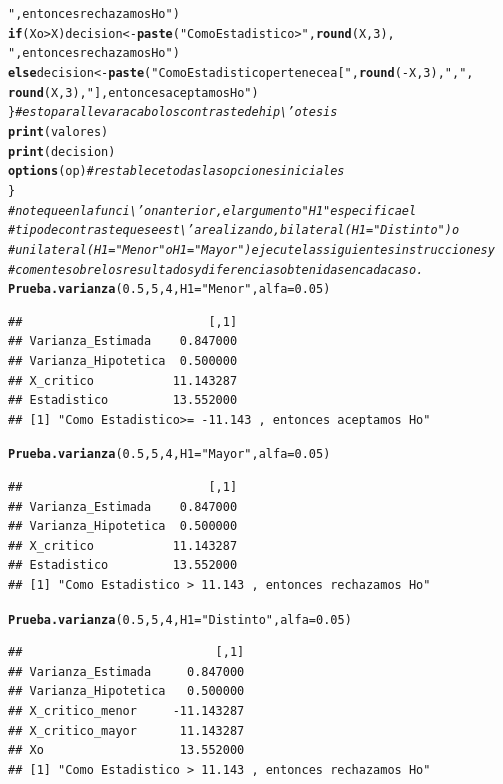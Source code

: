 \documentclass[12pt,letterpaper]{article}\usepackage[]{graphicx}\usepackage[]{color}
\makeatletter
\newcommand{\hlnum}[1]{\textcolor[rgb]{0.686,0.059,0.569}{#1}}%
\newcommand{\hlstr}[1]{\textcolor[rgb]{0.192,0.494,0.8}{#1}}%
\newcommand{\hlcom}[1]{\textcolor[rgb]{0.678,0.584,0.686}{\textit{#1}}}%
\newcommand{\hlopt}[1]{\textcolor[rgb]{0,0,0}{#1}}%
\newcommand{\hlstd}[1]{\textcolor[rgb]{0.345,0.345,0.345}{#1}}%
\newcommand{\hlkwa}[1]{\textcolor[rgb]{0.161,0.373,0.58}{\textbf{#1}}}%
\newcommand{\hlkwb}[1]{\textcolor[rgb]{0.69,0.353,0.396}{#1}}%
\newcommand{\hlkwc}[1]{\textcolor[rgb]{0.333,0.667,0.333}{#1}}%
\newcommand{\hlkwd}[1]{\textcolor[rgb]{0.737,0.353,0.396}{\textbf{#1}}}%
\newenvironment{kframe}{%
 \def\at@end@of@kframe{}%
 \ifinner\ifhmode%
  \def\at@end@of@kframe{\end{minipage}}%
  \begin{minipage}{\columnwidth}%
 \fi\fi%
 \def\FrameCommand##1{\hskip\@totalleftmargin \hskip-\fboxsep
 \colorbox{shadecolor}{##1}\hskip-\fboxsep
     \hskip-\linewidth \hskip-\@totalleftmargin \hskip\columnwidth}%
 \MakeFramed {\advance\hsize-\width
   \@totalleftmargin\z@ \linewidth\hsize
   \@setminipage}}%
 {\par\unskip\endMakeFramed%
 \at@end@of@kframe}
\newenvironment{knitrout}{}{} %
\makeatother
\begin{document}
\begin{knitrout}
\begin{kframe}
\begin{alltt}
                                \hlstr{", entonces rechazamos Ho"}\hlstd{)}
 \hlkwa{if} \hlstd{(Xo} \hlopt{>} \hlstd{X) decision} \hlkwb{<-} \hlkwd{paste}\hlstd{(}\hlstr{"Como Estadistico >"}\hlstd{,} \hlkwd{round}\hlstd{(X,}\hlnum{3}\hlstd{),}
                               \hlstr{", entonces rechazamos Ho"}\hlstd{)}
 \hlkwa{else} \hlstd{decision} \hlkwb{<-} \hlkwd{paste}\hlstd{(}\hlstr{"Como Estadistico pertenece a ["}\hlstd{,} \hlkwd{round}\hlstd{(}\hlopt{-}\hlstd{X,}\hlnum{3}\hlstd{),} \hlstr{","}\hlstd{,}
\hlkwd{round}\hlstd{(X,}\hlnum{3}\hlstd{),} \hlstr{"], entonces aceptamos Ho"}\hlstd{)}
\hlstd{\}} \hlcom{# esto para llevar a cabo los contraste de hip\textbackslash{}'otesis }
\hlkwd{print}\hlstd{(valores)}
\hlkwd{print}\hlstd{(decision)}
\hlkwd{options}\hlstd{(op)} \hlcom{# restablece todas las opciones iniciales }
\hlstd{\}}
\hlcom{# note que en la funci\textbackslash{}'on anterior, el argumento "H1" especifica el }
\hlcom{# tipo de contraste que se est\textbackslash{}'a realizando, bilateral (H1= "Distinto") o }
\hlcom{# unilateral (H1= "Menor" o H1= "Mayor") ejecute las siguientes instrucciones y }
\hlcom{# comente sobre los resultados y diferencias obtenidas en cada caso. }
\hlkwd{Prueba.varianza} \hlstd{(}\hlnum{0.5}\hlstd{,} \hlnum{5}\hlstd{,} \hlnum{4}\hlstd{,} \hlkwc{H1}\hlstd{=}\hlstr{"Menor"}\hlstd{,} \hlkwc{alfa}\hlstd{=}\hlnum{0.05}\hlstd{)}
\end{alltt}
\begin{verbatim}
##                          [,1]
## Varianza_Estimada    0.847000
## Varianza_Hipotetica  0.500000
## X_critico           11.143287
## Estadistico         13.552000
## [1] "Como Estadistico>= -11.143 , entonces aceptamos Ho"
\end{verbatim}
\begin{alltt}
\hlkwd{Prueba.varianza} \hlstd{(}\hlnum{0.5}\hlstd{,} \hlnum{5}\hlstd{,} \hlnum{4}\hlstd{,} \hlkwc{H1}\hlstd{=}\hlstr{"Mayor"}\hlstd{,} \hlkwc{alfa}\hlstd{=}\hlnum{0.05}\hlstd{)}
\end{alltt}
\begin{verbatim}
##                          [,1]
## Varianza_Estimada    0.847000
## Varianza_Hipotetica  0.500000
## X_critico           11.143287
## Estadistico         13.552000
## [1] "Como Estadistico > 11.143 , entonces rechazamos Ho"
\end{verbatim}
\begin{alltt}
\hlkwd{Prueba.varianza} \hlstd{(}\hlnum{0.5}\hlstd{,} \hlnum{5}\hlstd{,} \hlnum{4}\hlstd{,} \hlkwc{H1}\hlstd{=}\hlstr{"Distinto"}\hlstd{,} \hlkwc{alfa}\hlstd{=}\hlnum{0.05}\hlstd{)}
\end{alltt}
\begin{verbatim}
##                           [,1]
## Varianza_Estimada     0.847000
## Varianza_Hipotetica   0.500000
## X_critico_menor     -11.143287
## X_critico_mayor      11.143287
## Xo                   13.552000
## [1] "Como Estadistico > 11.143 , entonces rechazamos Ho"
\end{verbatim}
\end{kframe}
\end{knitrout}
\end{document}
